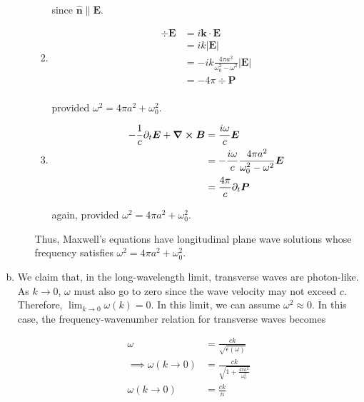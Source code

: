 \documentclass[]{article}
\begin{document}
\begin{enumerate}[a)]
\begin{enumerate}[(i)]
\begin{enumerate}[(M1)]
since $\bm{\hat{n}} \parallel \bm{E}$. \\

\item 

\begin{equation}
\begin{split}
\div \bm{E} & = i\bm{k} \cdot \bm{E} \\
& = ik | \bm{E} | \\ 
& = - ik \frac{4\pi a^2}{\omega_0^2 - \omega^2} | \bm{E} |   \\
& =  - 4\pi \div \bm{P} \\
\end{split}
\end{equation}

provided $\omega^2 = 4\pi a^2 + \omega_0^2 $. \\

\item 

\begin{equation}
\begin{split}
-\frac{1}{c} \partial_t \bm{E}  + \curl \bm{B} & =  \frac{i\omega}{c} \bm{E} \\
& =  - \frac{i\omega}{c }  \frac{4\pi a^2}{\omega_0^2 - \omega^2} \bm{E} \\
& = \frac{4\pi}{c} \partial_t \bm{P} \\
\end{split}
\end{equation}

again, provided $\omega^2 = 4\pi a^2 + \omega_0^2 $. \\

\end{enumerate} 

Thus, Maxwell's equations have longitudinal plane wave solutions whose frequency satisfies $\omega^2 = 4\pi a^2 + \omega_0^2 $. \\


\end{enumerate}


\item We claim that, in the long-wavelength limit, transverse waves are photon-like. As $k \to 0$, $\omega$ must also go to zero since the wave velocity may not exceed $c$. Therefore, $\lim_{k\to 0} \omega( k) = 0 $. In this limit, we can assume $\omega^2 \approx 0$. In this case, the frequency-wavenumber relation for transverse waves becomes


\begin{equation}
\begin{split}
\omega  & = \frac{ ck} {\sqrt{ \epsilon(\omega)  }} \\
\implies \omega( k\to 0) & = \frac{ ck }{\sqrt{  1+ \frac{4 \pi a^2}{ \omega_0^2}   }} \\
 \omega( k\to 0) & = \frac{ ck }{ n } \\
\end{split}
\end{equation}


\end{enumerate}
\end{document}

